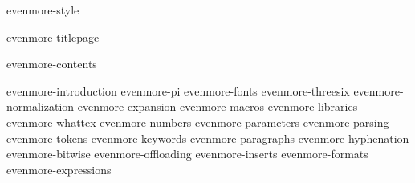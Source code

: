 
\environment evenmore-style

\dontcomplain

\startdocument

    \component evenmore-titlepage

    \startfrontmatter
        \component evenmore-contents
    \stopfrontmatter

    \startbodymatter
        \component evenmore-introduction
        \component evenmore-pi
        \component evenmore-fonts
        \component evenmore-threesix
        \component evenmore-normalization
        \component evenmore-expansion
        \component evenmore-macros
        \component evenmore-libraries
        \component evenmore-whattex
        \component evenmore-numbers
        \component evenmore-parameters
        \component evenmore-parsing
        \component evenmore-tokens
        \component evenmore-keywords
        \component evenmore-paragraphs
        \component evenmore-hyphenation
        \component evenmore-bitwise
        \component evenmore-offloading
        \component evenmore-inserts
        \component evenmore-formats
        \component evenmore-expressions
    \stopbodymatter

\stopdocument
